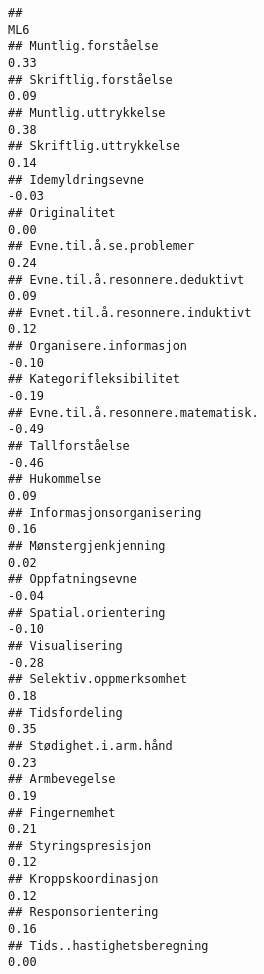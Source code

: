 \documentclass[
]{article}
\begin{document}
\begin{verbatim}
##                                                                                    ML6
## Muntlig.forståelse                                                                0.33
## Skriftlig.forståelse                                                              0.09
## Muntlig.uttrykkelse                                                               0.38
## Skriftlig.uttrykkelse                                                             0.14
## Idemyldringsevne                                                                 -0.03
## Originalitet                                                                      0.00
## Evne.til.å.se.problemer                                                           0.24
## Evne.til.å.resonnere.deduktivt                                                    0.09
## Evnet.til.å.resonnere.induktivt                                                   0.12
## Organisere.informasjon                                                           -0.10
## Kategorifleksibilitet                                                            -0.19
## Evne.til.å.resonnere.matematisk.                                                 -0.49
## Tallforståelse                                                                   -0.46
## Hukommelse                                                                        0.09
## Informasjonsorganisering                                                          0.16
## Mønstergjenkjenning                                                               0.02
## Oppfatningsevne                                                                  -0.04
## Spatial.orientering                                                              -0.10
## Visualisering                                                                    -0.28
## Selektiv.oppmerksomhet                                                            0.18
## Tidsfordeling                                                                     0.35
## Stødighet.i.arm.hånd                                                              0.23
## Armbevegelse                                                                      0.19
## Fingernemhet                                                                      0.21
## Styringspresisjon                                                                 0.12
## Kroppskoordinasjon                                                                0.12
## Responsorientering                                                                0.16
## Tids..hastighetsberegning                                                         0.00

\end{verbatim}
\end{document}
